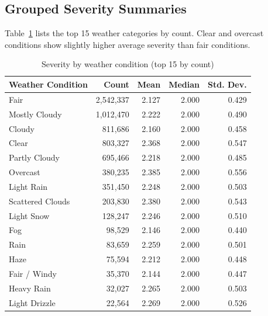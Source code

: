 \documentclass[11pt]{article}
\begin{document}
\subsection{Grouped Severity Summaries}
Table~\ref{tab:weather_condition} lists the top 15 weather categories by count. Clear and overcast conditions show slightly higher average severity than fair conditions.

\begin{table}[H]
    \centering
    \caption{Severity by weather condition (top 15 by count)}
    \label{tab:weather_condition}
    \begin{tabular}{lrrrr}
        \toprule
        Weather Condition & Count         & Mean  & Median & Std. Dev. \\
        \midrule
        Fair              & 2{,}542{,}337 & 2.127 & 2.000  & 0.429     \\
        Mostly Cloudy     & 1{,}012{,}470 & 2.222 & 2.000  & 0.490     \\
        Cloudy            & 811{,}686     & 2.160 & 2.000  & 0.458     \\
        Clear             & 803{,}327     & 2.368 & 2.000  & 0.547     \\
        Partly Cloudy     & 695{,}466     & 2.218 & 2.000  & 0.485     \\
        Overcast          & 380{,}235     & 2.385 & 2.000  & 0.556     \\
        Light Rain        & 351{,}450     & 2.248 & 2.000  & 0.503     \\
        Scattered Clouds  & 203{,}830     & 2.380 & 2.000  & 0.543     \\
        Light Snow        & 128{,}247     & 2.246 & 2.000  & 0.510     \\
        Fog               & 98{,}529      & 2.146 & 2.000  & 0.440     \\
        Rain              & 83{,}659      & 2.259 & 2.000  & 0.501     \\
        Haze              & 75{,}594      & 2.212 & 2.000  & 0.448     \\
        Fair / Windy      & 35{,}370      & 2.144 & 2.000  & 0.447     \\
        Heavy Rain        & 32{,}027      & 2.265 & 2.000  & 0.503     \\
        Light Drizzle     & 22{,}564      & 2.269 & 2.000  & 0.526     \\
        \bottomrule
    \end{tabular}
\end{table}
\end{document}
